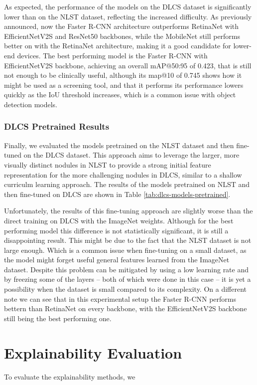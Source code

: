 

As expected, the performance of the models on the DLCS dataset is significantly lower than on the NLST dataset, reflecting the increased difficulty. As previously announced, now the Faster R-CNN architecture outperforms RetinaNet with EfficientNetV2S and ResNet50 backbones, while the MobileNet still performs better on with the RetinaNet architecture, making it a good candidate for lower-end devices.
The best performing model is the Faster R-CNN with EfficientNetV2S backbone, achieving an overall mAP@50:95 of 0.423, that is still not enough to be clinically useful, although its map@10 of 0.745 shows how it might be used as a screening tool, and that it performs its performance lowers quickly as the IoU threshold increases, which is a common issue with object detection models.

\subsubsection{DLCS Pretrained Results}
Finally, we evaluated the models pretrained on the NLST dataset and then fine-tuned on the DLCS dataset. This approach aims to leverage the larger, more visually distinct nodules in NLST to provide a strong initial feature representation for the more challenging nodules in DLCS, similar to a shallow curriculm learning approach.
The results of the models pretrained on NLST and then fine-tuned on DLCS are shown in Table \ref{tab:dlcs-models-pretrained}.



Unfortunately, the results of this fine-tuning approach are slightly worse than the direct training on DLCS with the ImageNet weights. Although for the best performing model this difference is not statistically significant, it is still a disappointing result.
This might be due to the fact that the NLST dataset is not large enough. Which is a common issue when fine-tuning on a small dataset, as the model might forget useful general features learned from the ImageNet dataset. Despite this problem can be mitigated by using a low learning rate and by freezing some of the layers -- both of which were done in this case -- it is yet a possibility when the dataset is small compared to its complexity. 
On a different note we can see that in this experimental setup the Faster R-CNN performs bettern than RetinaNet on every backbone, with the EfficientNetV2S backbone still being the best performing one.


\section{Explainability Evaluation}
To evaluate the explainability methods, we 


